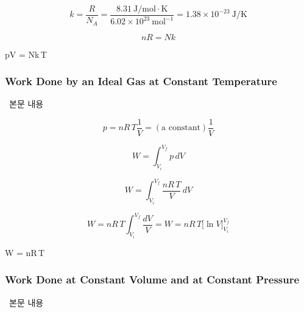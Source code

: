 \begin{equation} k = \frac{R}{N_A} = \frac{8.31\ \mathrm{J/mol \cdot K}}{6.02 \times 10^{23}\ \mathrm{mol^{-1}}} = 1.38 \times 10^{-23}\ \mathrm{J/K} \end{equation}

\begin{equation} nR = Nk \end{equation}

\begin{eqbox} pV = Nk\,T ~~~~~ 
\label{eq:second_expression_for_ideal_gas_law} \end{eqbox}

\subsubsection{Work Done by an Ideal Gas at Constant Temperature}
%
\ 본문 내용

\begin{equation} p = nR\,T \frac{1}{V} = (\text{a constant}) \frac{1}{V} \end{equation}

\begin{equation} W = \int_{V_i}^{V_f} p\, dV \end{equation}

\begin{equation} W = \int_{V_i}^{V_f} \frac{nR\,T}{V}\, dV \end{equation}

\begin{equation} W = nR\,T \int_{V_i}^{V_f} \frac{dV}{V} = W = nR\,T \Bigg[ \ln V \Bigg]_{V_i}^{V_f}
 \end{equation}

\begin{eqbox} W = nR\,T \ln {} ~~~~~ 
\label{eq:work_done_by_an_ideal_gas_during_an_isothermal_expansion} \end{eqbox}

\subsubsection{Work Done at Constant Volume and at Constant Pressure}
%
\ 본문 내용


